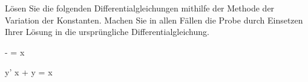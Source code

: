\begin{atiTask}[
	title = Die Methode der Variation der Konstanten I,
	topic = Gewöhnliche Differentialgleichungen,
	subtopic = Lineare Differentialgleichungen 1. Ordnung,
	language = Deutsch,
]
	Lösen Sie die folgenden Differentialgleichungen mithilfe der Methode der Variation der Konstanten.
	Machen Sie in allen Fällen die Probe durch Einsetzen Ihrer Lösung in die ursprüngliche Differentialgleichung.
	\begin{atiSubequations}
		\item{
			- = \sin x
		}
		\item{
			y' \tan x + y = \sin x
		}
	\end{atiSubequations}
\end{atiTask}